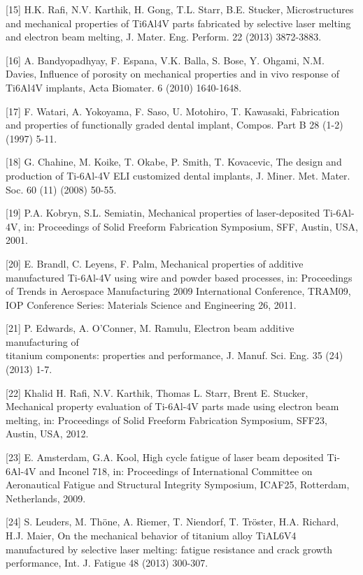 \documentclass[10pt]{article}
\begin{document}
[15] H.K. Rafi, N.V. Karthik, H. Gong, T.L. Starr, B.E. Stucker, Microstructures and mechanical properties of Ti6Al4V parts fabricated by selective laser melting and electron beam melting, J. Mater. Eng. Perform. 22 (2013) 3872-3883.

[16] A. Bandyopadhyay, F. Espana, V.K. Balla, S. Bose, Y. Ohgami, N.M. Davies, Influence of porosity on mechanical properties and in vivo response of Ti6Al4V implants, Acta Biomater. 6 (2010) 1640-1648.

[17] F. Watari, A. Yokoyama, F. Saso, U. Motohiro, T. Kawasaki, Fabrication and properties of functionally graded dental implant, Compos. Part B 28 (1-2) (1997) 5-11.

[18] G. Chahine, M. Koike, T. Okabe, P. Smith, T. Kovacevic, The design and production of Ti-6Al-4V ELI customized dental implants, J. Miner. Met. Mater. Soc. 60 (11) (2008) 50-55.

[19] P.A. Kobryn, S.L. Semiatin, Mechanical properties of laser-deposited Ti-6Al-4V, in: Proceedings of Solid Freeform Fabrication Symposium, SFF, Austin, USA, 2001.

[20] E. Brandl, C. Leyens, F. Palm, Mechanical properties of additive manufactured Ti-6Al-4V using wire and powder based processes, in: Proceedings of Trends in Aerospace Manufacturing 2009 International Conference, TRAM09, IOP Conference Series: Materials Science and Engineering 26, 2011.

[21] P. Edwards, A. O'Conner, M. Ramulu, Electron beam additive manufacturing of\\
titanium components: properties and performance, J. Manuf. Sci. Eng. 35 (24) (2013) 1-7.

[22] Khalid H. Rafi, N.V. Karthik, Thomas L. Starr, Brent E. Stucker, Mechanical property evaluation of Ti-6Al-4V parts made using electron beam melting, in: Proceedings of Solid Freeform Fabrication Symposium, SFF23, Austin, USA, 2012.

[23] E. Amsterdam, G.A. Kool, High cycle fatigue of laser beam deposited Ti-6Al-4V and Inconel 718, in: Proceedings of International Committee on Aeronautical Fatigue and Structural Integrity Symposium, ICAF25, Rotterdam, Netherlands, 2009.

[24] S. Leuders, M. Thöne, A. Riemer, T. Niendorf, T. Tröster, H.A. Richard, H.J. Maier, On the mechanical behavior of titanium alloy TiAL6V4 manufactured by selective laser melting: fatigue resistance and crack growth performance, Int. J. Fatigue 48 (2013) 300-307.
\end{document}
